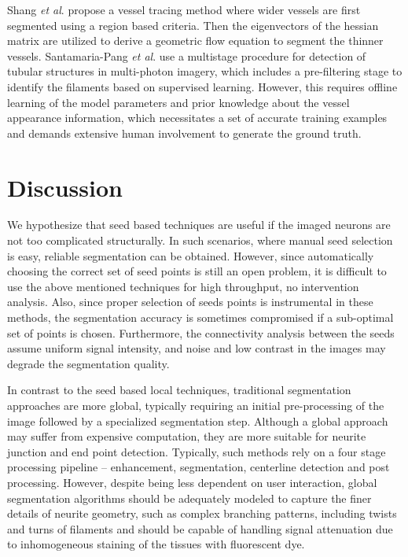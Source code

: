 Shang \textit{et al}. \cite{shang2011vascular} propose a vessel tracing method where wider vessels are first segmented using a region based criteria. Then the eigenvectors of the hessian matrix are utilized to derive a geometric flow equation to segment the thinner vessels. Santamaria-Pang \textit{et al}. \cite{santamaria2007automatic} use a multistage procedure for detection of tubular structures in multi-photon imagery, which includes a pre-filtering stage to identify the filaments based on supervised learning. However, this requires offline learning of the model parameters and prior knowledge about the vessel appearance information, which necessitates a set of accurate training examples and demands extensive human involvement to generate the ground truth.

\section{Discussion}
We hypothesize that seed based techniques are useful if the imaged neurons are not too complicated structurally. In such scenarios, where manual seed selection is easy, reliable segmentation can be obtained. However, since automatically choosing the correct set of seed points is still an open problem, it is difficult to use the above mentioned techniques for high throughput, no intervention analysis. Also, since proper selection of seeds points is instrumental in these methods, the segmentation accuracy is sometimes compromised if a sub-optimal set of points is chosen. Furthermore, the connectivity analysis between the seeds assume uniform signal intensity, and noise and low contrast in the images may degrade the segmentation quality.

In contrast to the seed based local techniques, traditional segmentation approaches are more global, typically requiring an initial pre-processing of the image followed by a specialized segmentation step. Although a global approach may suffer from expensive computation, they are more suitable for neurite junction and end point detection.
Typically, such methods rely on a four stage processing pipeline -- enhancement, segmentation, centerline detection and post processing. However, despite being less dependent on user interaction, global segmentation algorithms should be adequately modeled to capture the finer details of neurite geometry, such as complex branching patterns, including twists and turns of filaments and should be capable of handling signal attenuation due to inhomogeneous staining of the tissues with fluorescent dye.

